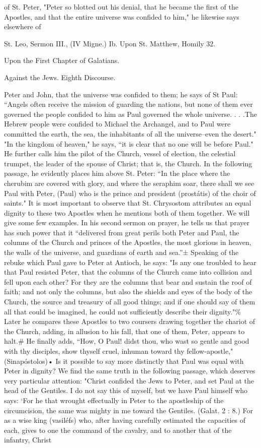 of St. Peter, "Peter so blotted out his denial, that he became the first of the Apostles, and that the entire universe was confided to him," he likewise says elsewhere of

St. Leo, Sermon III., (IV Migne.) Ib. Upon St. Matthew, Homily 32.

Upon the First Chapter of Galatians.

Against the Jews. Eighth Discourse.

Peter and John, that the universe was confided to them; he says of St Paul: “Angels often receive the mission of guarding the nations, but none of them ever governed the people confided to him as Paul governed the whole universe. . . .The Hebrew people were confided to Michael the Archangel, and to Paul were committed the earth, the sea, the inhabitants of all the universe--even the desert." "In the kingdom of heaven," he says, “it is clear that no one will be before Paul." He further calls him the pilot of the Church, vessel of election, the celestial trumpet, the leader of the spouse of Christ; that is, the Church. In the following passage, he evidently places him above St. Peter: “In the place where the cherubim are covered with glory, and where the seraphim soar, there shall we see Paul with Peter, (Paul) who is the prince and president (prostátis) of the choir of saints." It is most important to observe that St. Chrysostom attributes an equal dignity to these two Apostles when he mentions both of them together. We will give some few examples. In his second sermon on prayer, he tells us that prayer has such power that it “delivered from great perils both Peter and Paul, the columns of the Church and princes of the Apostles, the most glorious in heaven, the walls of the universe, and guardians of earth and sea.”± Speaking of the rebuke which Paul gave to Peter at Antioch, he says: "Is any one troubled to hear that Paul resisted Peter, that the columns of the Church came into collision and fell upon each other? For they are the columns that bear and sustain the roof of faith; and not only the columns, but also the shields and eyes of the body of the Church, the source and treasury of all good things; and if one should say of them all that could be imagined, he could not sufficiently describe their dignity."\% Later he compares these Apostles to two coursers drawing together the chariot of the Church, adding, in allusion to his fall, that one of them, Peter, appears to halt.\# He finally adds, “How, O Paul! didst thou, who wast so gentle and good with thy disciples, show thyself cruel, inhuman toward thy fellow-apostle," (Sinapóstolos)• Is it possible to say more distinctly that Paul was equal with Peter in dignity? We find the same truth in the following passage, which deserves very particular attention: "Christ confided the Jews to Peter, and set Paul at the head of the Gentiles. I do not say this of myself, but we have Paul himself who says: ‘For he that wrought effectually in Peter to the apostleship of the circumcision, the same was mighty in me toward the Gentiles. (Galat. 2 : 8.) For as a wise king (vasiléfs) who, after having carefully estimated the capacities of each, gives to one the command of the cavalry, and to another that of the infantry, Christ 